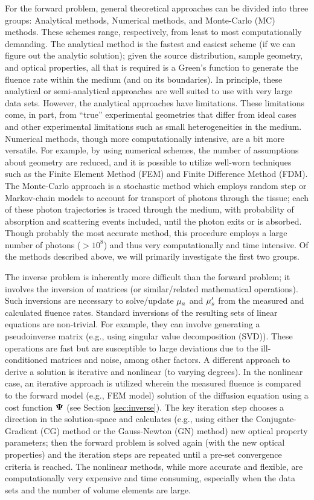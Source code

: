 For the forward problem, general theoretical approaches can be divided into three groups: Analytical methods, Numerical methods, and Monte-Carlo (MC) methods. These schemes range, respectively, from least to most computationally demanding. The analytical method is the fastest and easiest scheme (if we can figure out the analytic solution); given the source distribution, sample geometry, and optical properties, all that is required is a Green's function to generate the fluence rate within the medium (and on its boundaries). In principle, these analytical or semi-analytical approaches are well suited to use with very large data sets. However, the analytical approaches have limitations. These limitations come, in part, from “true” experimental geometries that differ from ideal cases and other experimental limitations such as small heterogeneities in the medium. Numerical methods, though more computationally intensive, are a bit more versatile. For example, by using numerical schemes, the number of assumptions about geometry are reduced, and it is possible to utilize well-worn techniques such as the Finite Element Method (FEM) and Finite Difference Method (FDM). The Monte-Carlo approach is a stochastic method which employs random step or Markov-chain models to account for transport of photons through the tissue; each of these photon trajectories is traced through the medium, with probability of absorption and scattering events included, until the photon exits or is absorbed. Though probably the most accurate method, this procedure employs a large number of photons ($>10^8$) and thus very computationally and time intensive. Of the methods described above, we will primarily investigate the first two groups.

The inverse problem is inherently more difficult than the forward problem; it involves the inversion of matrices (or similar/related mathematical operations). Such inversions are necessary to solve/update $\mu_a$ and $\mu_s^{\prime}$ from the measured and calculated fluence rates.  Standard inversions of the resulting sets of linear equations are non-trivial. For example, they can involve generating a pseudoinverse matrix (e.g., using singular value decomposition (SVD)). These operations are fast but are susceptible to large deviations due to the ill-conditioned matrices and noise, among other factors. A different approach to derive a solution is iterative and nonlinear (to varying degrees). In the nonlinear case, an iterative approach is utilized wherein the measured fluence is compared to the forward model (e.g., FEM model) solution of the diffusion equation using a cost function $\mathbf{\Psi}$ (see Section \ref{sec:inverse}). The key iteration step chooses a direction in the solution-space and calculates (e.g., using either the Conjugate-Gradient (CG) method or the Gauss-Newton (GN) method) new optical property parameters; then the forward problem is solved again (with the new optical properties) and the iteration steps are repeated until a pre-set convergence criteria is reached. The nonlinear methods, while more accurate and flexible, are computationally very expensive and time consuming, especially when the data sets and the number of volume elements are large.

